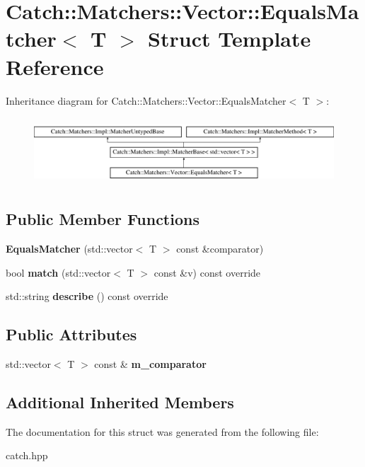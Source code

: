 \hypertarget{struct_catch_1_1_matchers_1_1_vector_1_1_equals_matcher}{}\section{Catch\+:\+:Matchers\+:\+:Vector\+:\+:Equals\+Matcher$<$ T $>$ Struct Template Reference}
\label{struct_catch_1_1_matchers_1_1_vector_1_1_equals_matcher}
Inheritance diagram for Catch\+:\+:Matchers\+:\+:Vector\+:\+:Equals\+Matcher$<$ T $>$\+:\begin{figure}[H]
\begin{center}
\leavevmode
\includegraphics[height=2.514970cm]{struct_catch_1_1_matchers_1_1_vector_1_1_equals_matcher}
\end{center}
\end{figure}
\subsection*{Public Member Functions}
\begin{DoxyCompactItemize}
\item 
\mbox{\label{struct_catch_1_1_matchers_1_1_vector_1_1_equals_matcher_a3846c47780d1991dcfe87aefded98008}} 
{\bfseries Equals\+Matcher} (std\+::vector$<$ T $>$ const \&comparator)
\item 
\mbox{\label{struct_catch_1_1_matchers_1_1_vector_1_1_equals_matcher_a2d96cca58a44151fddc5257eda3305da}} 
bool {\bfseries match} (std\+::vector$<$ T $>$ const \&v) const override
\item 
\mbox{\label{struct_catch_1_1_matchers_1_1_vector_1_1_equals_matcher_a36b5f7ecada4081d6c65bebe8ddea6f4}} 
std\+::string {\bfseries describe} () const override
\end{DoxyCompactItemize}
\subsection*{Public Attributes}
\begin{DoxyCompactItemize}
\item 
\mbox{\label{struct_catch_1_1_matchers_1_1_vector_1_1_equals_matcher_a56f7aa6f110a12b1b9aeb0cabbc9d755}} 
std\+::vector$<$ T $>$ const  \& {\bfseries m\+\_\+comparator}
\end{DoxyCompactItemize}
\subsection*{Additional Inherited Members}


The documentation for this struct was generated from the following file\+:\begin{DoxyCompactItemize}
\item 
catch.\+hpp\end{DoxyCompactItemize}
